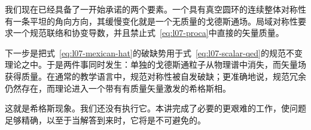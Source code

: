 我们现在已经具备了一开始承诺的两个要素。一个具有真空圆环的连续整体对称性有一条平坦的角向方向，其缓慢变化就是一个无质量的戈德斯通场。局域对称性要求一个规范联络和协变导数，并且禁止式~\eqref{eq:l07-proca}中直接的矢量质量。

下一步是把式~\eqref{eq:l07-mexican-hat}的破缺势用于式~\eqref{eq:l07-scalar-qed}的规范不变理论之中。于是两件事同时发生：单独的戈德斯通粒子从物理谱中消失，而矢量场获得质量。在通常的教学语言中，规范对称性被自发破缺；更准确地说，规范冗余仍然存在，而理论进入一个带有有质量矢量激发的希格斯相。

这就是希格斯现象。我们还没有执行它。本讲完成了必要的更艰难的工作，使问题足够精确，以至于当解答到来时，它将是不可避免的。
